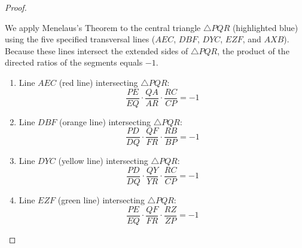 \documentclass[reqno]{amsart}
\DeclareMathOperator{\1}{\textbf{1}}
\begin{document}
\begin{proof}
\begin{figure}[h]
\end{figure}

We apply Menelaus's Theorem to the central triangle $\triangle PQR$ (highlighted blue) using the five specified transversal lines ($AEC$, $DBF$, $DYC$, $EZF$, and $AXB$). Because these lines intersect the extended sides of $\triangle PQR$, the product of the directed ratios of the segments equals $-1$.

\begin{enumerate}
    \item Line $AEC$ (red line) intersecting $\triangle PQR$:
    \[ \frac{PE}{EQ} \cdot \frac{QA}{AR} \cdot \frac{RC}{CP} = -1 \]
    
    \item Line $DBF$ (orange line) intersecting $\triangle PQR$:
    \[ \frac{PD}{DQ} \cdot \frac{QF}{FR} \cdot \frac{RB}{BP} = -1 \]
    
    \item Line $DYC$ (yellow line) intersecting $\triangle PQR$:
    \[ \frac{PD}{DQ} \cdot \frac{QY}{YR} \cdot \frac{RC}{CP} = -1 \]
    
    \item Line $EZF$ (green line) intersecting $\triangle PQR$:
    \[ \frac{PE}{EQ} \cdot \frac{QF}{FR} \cdot \frac{RZ}{ZP} = -1 \]
    

\end{enumerate}
\end{proof}
\end{document}
